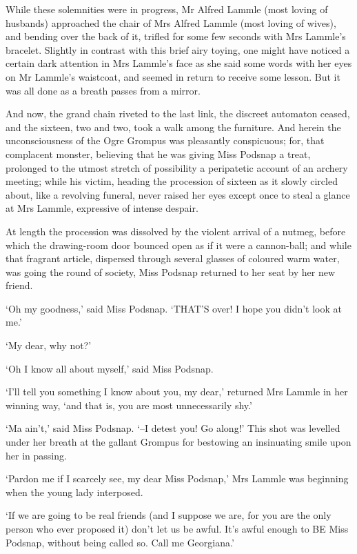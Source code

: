 While these solemnities were in progress, Mr Alfred Lammle (most loving
of husbands) approached the chair of Mrs Alfred Lammle (most loving of
wives), and bending over the back of it, trifled for some few seconds
with Mrs Lammle’s bracelet. Slightly in contrast with this brief airy
toying, one might have noticed a certain dark attention in Mrs Lammle’s
face as she said some words with her eyes on Mr Lammle’s waistcoat, and
seemed in return to receive some lesson. But it was all done as a breath
passes from a mirror.

And now, the grand chain riveted to the last link, the discreet
automaton ceased, and the sixteen, two and two, took a walk among
the furniture. And herein the unconsciousness of the Ogre Grompus was
pleasantly conspicuous; for, that complacent monster, believing that
he was giving Miss Podsnap a treat, prolonged to the utmost stretch
of possibility a peripatetic account of an archery meeting; while his
victim, heading the procession of sixteen as it slowly circled about,
like a revolving funeral, never raised her eyes except once to steal a
glance at Mrs Lammle, expressive of intense despair.

At length the procession was dissolved by the violent arrival of a
nutmeg, before which the drawing-room door bounced open as if it were a
cannon-ball; and while that fragrant article, dispersed through several
glasses of coloured warm water, was going the round of society, Miss
Podsnap returned to her seat by her new friend.

‘Oh my goodness,’ said Miss Podsnap. ‘THAT’S over! I hope you didn’t
look at me.’

‘My dear, why not?’

‘Oh I know all about myself,’ said Miss Podsnap.

‘I’ll tell you something I know about you, my dear,’ returned Mrs Lammle
in her winning way, ‘and that is, you are most unnecessarily shy.’

‘Ma ain’t,’ said Miss Podsnap. ‘--I detest you! Go along!’ This shot
was levelled under her breath at the gallant Grompus for bestowing an
insinuating smile upon her in passing.

‘Pardon me if I scarcely see, my dear Miss Podsnap,’ Mrs Lammle was
beginning when the young lady interposed.

‘If we are going to be real friends (and I suppose we are, for you are
the only person who ever proposed it) don’t let us be awful. It’s awful
enough to BE Miss Podsnap, without being called so. Call me Georgiana.’

